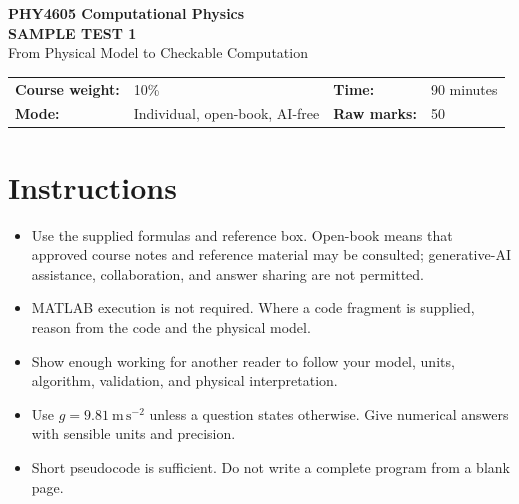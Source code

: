 \documentclass[11pt,a4paper]{article}
\begin{document}
\begin{center}
  {\LARGE\color{navy}\textbf{PHY4605 Computational Physics}}\\[4pt]
  {\Large\color{teal}\textbf{SAMPLE TEST 1}}\\[4pt]
  {\large From Physical Model to Checkable Computation}
\end{center}

\vspace{4pt}
\begin{tabularx}{\textwidth}{@{}>{\bfseries}l X >{\bfseries}l X@{}}
  Course weight: & 10\% & Time: & 90 minutes \\
  Mode: & Individual, open-book, AI-free & Raw marks: & 50
\end{tabularx}

\vspace{6pt}

\section*{Instructions}
\begin{itemize}
  \item Use the supplied formulas and reference box. Open-book means that approved course notes and reference material may be consulted; generative-AI assistance, collaboration, and answer sharing are not permitted.
  \item MATLAB execution is not required. Where a code fragment is supplied, reason from the code and the physical model.
  \item Show enough working for another reader to follow your model, units, algorithm, validation, and physical interpretation.
  \item Use \(g=9.81\ \mathrm{m\,s^{-2}}\) unless a question states otherwise. Give numerical answers with sensible units and precision.
  \item Short pseudocode is sufficient. Do not write a complete program from a blank page.
\end{itemize}
\end{document}
